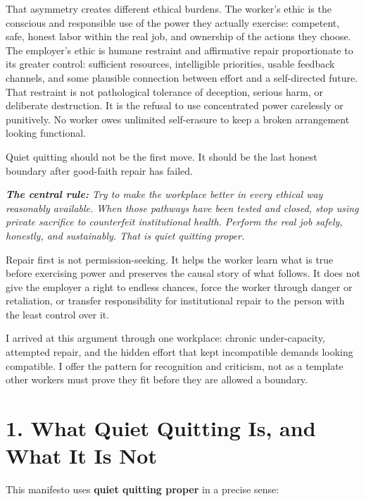 \documentclass[11pt,oneside]{article}
\renewenvironment{quote}
  {\begin{tcolorbox}[
      enhanced,
      breakable,
      colback=ManifestLight,
      colframe=ManifestRule,
      boxrule=0pt,
      leftrule=3pt,
      arc=0pt,
      outer arc=0pt,
      left=10pt,right=10pt,top=8pt,bottom=8pt,
      before skip=0.8em,after skip=0.8em
    ]\itshape}
  {\end{tcolorbox}}
\begin{document}
That asymmetry creates different ethical burdens. The worker's ethic is
the conscious and responsible use of the power they actually exercise:
competent, safe, honest labor within the real job, and ownership of the
actions they choose. The employer's ethic is humane restraint and
affirmative repair proportionate to its greater control: sufficient
resources, intelligible priorities, usable feedback channels, and some
plausible connection between effort and a self-directed future. That
restraint is not pathological tolerance of deception, serious harm, or
deliberate destruction. It is the refusal to use concentrated power
carelessly or punitively. No worker owes unlimited self-erasure to keep
a broken arrangement looking functional.

Quiet quitting should not be the first move. It should be the last
honest boundary after good-faith repair has failed.

\begin{quote}
\textbf{The central rule:} Try to make the workplace better in every
ethical way reasonably available. When those pathways have been tested
and closed, stop using private sacrifice to counterfeit institutional
health. Perform the real job safely, honestly, and sustainably. That is
quiet quitting proper.
\end{quote}

Repair first is not permission-seeking. It helps the worker learn what
is true before exercising power and preserves the causal story of what
follows. It does not give the employer a right to endless chances, force
the worker through danger or retaliation, or transfer responsibility for
institutional repair to the person with the least control over it.

I arrived at this argument through one workplace: chronic
under-capacity, attempted repair, and the hidden effort that kept
incompatible demands looking compatible. I offer the pattern for
recognition and criticism, not as a template other workers must prove
they fit before they are allowed a boundary.

\hypertarget{what-quiet-quitting-is-and-what-it-is-not}{%
\section{1. What Quiet Quitting Is, and What It Is
Not}\label{what-quiet-quitting-is-and-what-it-is-not}}

This manifesto uses \textbf{quiet quitting proper} in a precise sense:
\end{document}
